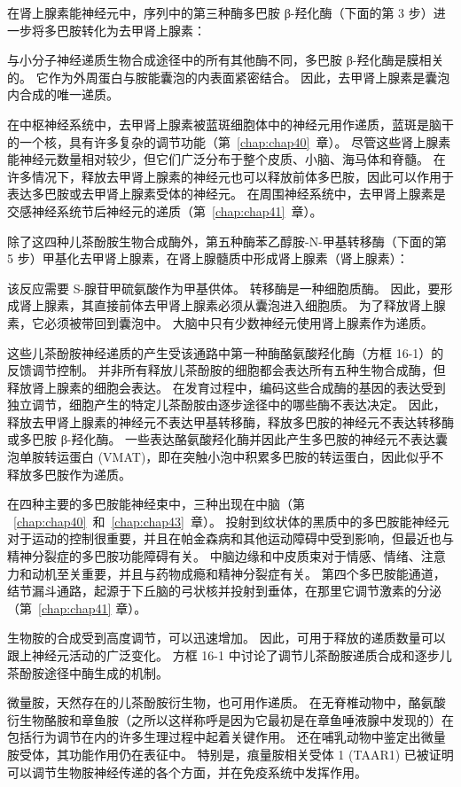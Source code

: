 在肾上腺素能神经元中，序列中的第三种酶多巴胺 β-羟化酶（下面的第 3 步）进一步将多巴胺转化为去甲肾上腺素：


与小分子神经递质生物合成途径中的所有其他酶不同，多巴胺 β-羟化酶是膜相关的。
它作为外周蛋白与胺能囊泡的内表面紧密结合。
因此，去甲肾上腺素是囊泡内合成的唯一递质。


在中枢神经系统中，去甲肾上腺素被蓝斑细胞体中的神经元用作递质，蓝斑是脑干的一个核，具有许多复杂的调节功能（第~\ref{chap:chap40}~章）。
尽管这些肾上腺素能神经元数量相对较少，但它们广泛分布于整个皮质、小脑、海马体和脊髓。
在许多情况下，释放去甲肾上腺素的神经元也可以释放前体多巴胺，因此可以作用于表达多巴胺或去甲肾上腺素受体的神经元。
在周围神经系统中，去甲肾上腺素是交感神经系统节后神经元的递质（第~\ref{chap:chap41}~章）。


除了这四种儿茶酚胺生物合成酶外，第五种酶苯乙醇胺-N-甲基转移酶（下面的第 5 步）甲基化去甲肾上腺素，在肾上腺髓质中形成肾上腺素（肾上腺素）：


该反应需要 S-腺苷甲硫氨酸作为甲基供体。
转移酶是一种细胞质酶。
因此，要形成肾上腺素，其直接前体去甲肾上腺素必须从囊泡进入细胞质。
为了释放肾上腺素，它必须被带回到囊泡中。
大脑中只有少数神经元使用肾上腺素作为递质。


这些儿茶酚胺神经递质的产生受该通路中第一种酶酪氨酸羟化酶（方框 16-1）的反馈调节控制。
并非所有释放儿茶酚胺的细胞都会表达所有五种生物合成酶，但释放肾上腺素的细胞会表达。
在发育过程中，编码这些合成酶的基因的表达受到独立调节，细胞产生的特定儿茶酚胺由逐步途径中的哪些酶不表达决定。
因此，释放去甲肾上腺素的神经元不表达甲基转移酶，释放多巴胺的神经元不表达转移酶或多巴胺 β-羟化酶。
一些表达酪氨酸羟化酶并因此产生多巴胺的神经元不表达囊泡单胺转运蛋白 (VMAT)，即在突触小泡中积累多巴胺的转运蛋白，因此似乎不释放多巴胺作为递质。


在四种主要的多巴胺能神经束中，三种出现在中脑（第 ~\ref{chap:chap40}~和~\ref{chap:chap43}~章）。
投射到纹状体的黑质中的多巴胺能神经元对于运动的控制很重要，并且在帕金森病和其他运动障碍中受到影响，但最近也与精神分裂症的多巴胺功能障碍有关。
中脑边缘和中皮质束对于情感、情绪、注意力和动机至关重要，并且与药物成瘾和精神分裂症有关。
第四个多巴胺能通道，结节漏斗通路，起源于下丘脑的弓状核并投射到垂体，在那里它调节激素的分泌（第~\ref{chap:chap41} 章）。


生物胺的合成受到高度调节，可以迅速增加。
因此，可用于释放的递质数量可以跟上神经元活动的广泛变化。
方框 16-1 中讨论了调节儿茶酚胺递质合成和逐步儿茶酚胺途径中酶生成的机制。


微量胺，天然存在的儿茶酚胺衍生物，也可用作递质。
在无脊椎动物中，酪氨酸衍生物酪胺和章鱼胺（之所以这样称呼是因为它最初是在章鱼唾液腺中发现的）在包括行为调节在内的许多生理过程中起着关键作用。
还在哺乳动物中鉴定出微量胺受体，其功能作用仍在表征中。
特别是，痕量胺相关受体 1 (TAAR1) 已被证明可以调节生物胺神经传递的各个方面，并在免疫系统中发挥作用。


